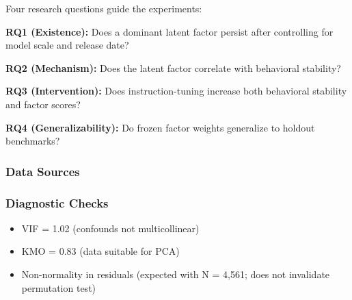 
Four research questions guide the experiments:

\textbf{RQ1 (Existence):} Does a dominant latent factor persist after controlling for model scale and release date?

\textbf{RQ2 (Mechanism):} Does the latent factor correlate with behavioral stability?

\textbf{RQ3 (Intervention):} Does instruction-tuning increase both behavioral stability and factor scores?

\textbf{RQ4 (Generalizability):} Do frozen factor weights generalize to holdout benchmarks?

\subsubsection{Data Sources}

\begin{table}[htbp]
\centering
{}
\end{table}

\subsubsection{Diagnostic Checks}

\begin{itemize}
\item VIF = 1.02 (confounds not multicollinear)
\item KMO = 0.83 (data suitable for PCA)
\item Non-normality in residuals (expected with N = 4,561; does not invalidate permutation test)
\end{itemize}
